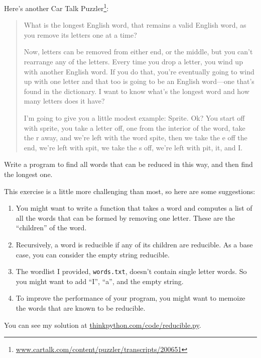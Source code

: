 \documentclass[10pt]{book}
\begin{document}
\begin{ex}


Here's another Car Talk Puzzler\footnote{
\url{www.cartalk.com/content/puzzler/transcripts/200651}}:

\begin{quote}
What is the longest English word, that remains a valid English word,
as you remove its letters one at a time?

Now, letters can be removed from either end, or the middle, but you
can't rearrange any of the letters. Every time you drop a letter, you
wind up with another English word. If you do that, you're eventually
going to wind up with one letter and that too is going to be an
English word---one that's found in the dictionary. I want to know
what's the longest word and how many letters does it
have?

I'm going to give you a little modest example: Sprite. Ok? You start
off with sprite, you take a letter off, one from the interior of the
word, take the r away, and we're left with the word spite, then we
take the e off the end, we're left with spit, we take the s off, we're
left with pit, it, and I.
\end{quote}


Write a program to find all words that can be reduced in this way,
and then find the longest one.

This exercise is a little more challenging than most, so here are
some suggestions:

\begin{enumerate}

\item You might want to write a function that takes a word and
  computes a list of all the words that can be formed by removing one
  letter.  These are the ``children'' of the word.


\item Recursively, a word is reducible if any of its children
are reducible.  As a base case, you can consider the empty
string reducible.

\item The wordlist I provided, {\tt words.txt}, doesn't
contain single letter words.  So you might want to add
``I'', ``a'', and the empty string.

\item To improve the performance of your program, you might want
to memoize the words that are known to be reducible.

\end{enumerate}

You can see my solution at \url{thinkpython.com/code/reducible.py}.

\end{ex}
\end{document}
